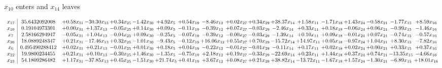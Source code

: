\documentclass[9pt]{article}
\begin{document}
 $ x_{10} $ enters and $ x_{14} $ leaves 

 \[\begin{array}{c| c c@{\hskip 2pt} c@{\hskip 2pt} c@{\hskip 2pt} c@{\hskip 2pt} c@{\hskip 2pt} c@{\hskip 2pt} c@{\hskip 2pt} c@{\hskip 2pt} c@{\hskip 2pt} c@{\hskip 2pt} c@{\hskip 2pt} c@{\hskip 2pt} c@{\hskip 2pt} c@{\hskip 2pt} c@{\hskip 2pt} c@{\hskip 2pt} }
 x_{17}   &  35.6432092008 & +  0.58 x_{31} & -30.30 x_{13} & +  0.34 x_{25} & -1.42 x_{30} & +  4.92 x_{5} & +  0.54 x_{19} & -8.46 x_{12} & +  0.02 x_{27} & +  0.34 x_{29} & + 38.37 x_{14} & +  1.58 x_{11} & -1.71 x_{18} & +  1.43 x_{24} & -0.58 x_{21} & -1.77 x_{15} & +  8.59 x_{16}\\
 x_{10}   &  0.19104973301 & +  0.00 x_{31} & +  1.37 x_{13} & -0.05 x_{25} & +  0.14 x_{30} & +  0.09 x_{5} & -0.11 x_{19} & -0.39 x_{12} & +  0.07 x_{27} & -0.03 x_{29} & -2.46 x_{14} & +  0.33 x_{11} & +  0.18 x_{18} & -0.06 x_{24} & +  0.06 x_{21} & -0.99 x_{15} & -1.46 x_{16}\\
 x_{7}   &  2.58166294947 & -0.05 x_{31} & +  1.04 x_{13} & -0.04 x_{25} & +  0.09 x_{30} & -0.25 x_{5} & -0.07 x_{19} & -0.39 x_{12} & -0.00 x_{27} & -0.03 x_{29} & -1.39 x_{14} & +  0.10 x_{11} & +  0.09 x_{18} & -0.01 x_{24} & +  0.07 x_{21} & -0.74 x_{15} & -0.57 x_{16}\\
 x_{20}   &  18.0889248347 & +  0.21 x_{31} & -17.46 x_{13} & +  0.32 x_{25} & -1.01 x_{30} & -9.43 x_{5} & -0.12 x_{19} & + 16.06 x_{12} & +  0.55 x_{27} & +  0.70 x_{29} & -15.72 x_{14} & + 14.97 x_{11} & +  0.05 x_{18} & -0.97 x_{24} & +  1.04 x_{21} & +  8.30 x_{15} & -7.82 x_{16}\\
 x_{6}   &  0.495490288412 & +  0.02 x_{31} & +  0.21 x_{13} & -0.01 x_{25} & +  0.01 x_{30} & +  0.18 x_{5} & +  0.04 x_{19} & -0.22 x_{12} & -0.01 x_{27} & -0.01 x_{29} & -0.11 x_{14} & +  0.17 x_{11} & +  0.02 x_{18} & +  0.02 x_{24} & +  0.00 x_{21} & +  0.33 x_{15} & +  0.37 x_{16}\\
 x_{22}   &  19.9800234455 & +  0.21 x_{31} & +  0.10 x_{13} & -0.30 x_{25} & +  1.46 x_{30} & -1.35 x_{5} & -0.75 x_{19} & +  2.18 x_{12} & +  0.19 x_{27} & -0.33 x_{29} & -22.69 x_{14} & +  0.23 x_{11} & +  1.44 x_{18} & +  0.37 x_{24} & +  0.74 x_{21} & -13.35 x_{15} & -4.66 x_{16}\\
 x_{23}   &  54.1809286482 & +  1.17 x_{31} & -37.85 x_{13} & +  0.45 x_{25} & -1.51 x_{30} & + 21.74 x_{5} & +  0.41 x_{19} & +  3.67 x_{12} & +  0.08 x_{27} & +  0.21 x_{29} & + 38.82 x_{14} & -13.72 x_{11} & -1.67 x_{18} & +  1.57 x_{24} & -1.30 x_{21} & -6.89 x_{15} & + 18.01 x_{16}\\

\end{array}\]
\end{document}
